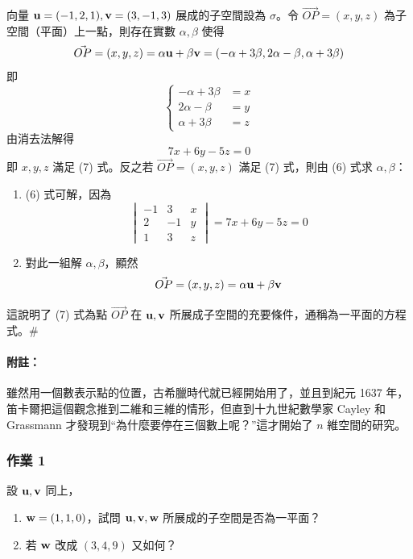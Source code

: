 \begin{discussion}\label{disc:b6s-1-1}
向量 $\boldsymbol{\mathbf{u}}=(-1, 2, 1), \boldsymbol{\mathbf{v}}=(3, -1, 3)$ 展成的子空間設為 $\sigma$。令 $\vec{OP}=(x, y, z)$ 為子空間（平面）上一點，則存在實數 $\alpha, \beta$ 使得
\[ \vec{OP}=(x, y, z) = \alpha \boldsymbol{\mathbf{u}} + \beta \boldsymbol{\mathbf{v}} = (-\alpha+3\beta, 2\alpha-\beta, \alpha+3\beta) \]
即
\begin{equation}
\left\{\begin{aligned}
-\alpha + 3\beta &= x \\
2\alpha - \beta &= y \\
\alpha + 3\beta &= z
\end{aligned}\right. \label{eq:b6s-1-1-6}
\end{equation}
由消去法解得
\begin{equation}
7x + 6y - 5z = 0 \label{eq:b6s-1-1-7}
\end{equation}
即 $x, y, z$ 滿足 (7) 式。反之若 $\vec{OP}=(x, y, z)$ 滿足 (7) 式，則由 (6) 式求 $\alpha, \beta$：
\begin{enumerate}[label=(\roman*), leftmargin=2em]
  \item (6) 式可解，因為
  \[ \begin{vmatrix} -1 & 3 & x \\ 2 & -1 & y \\ 1 & 3 & z \end{vmatrix} = 7x + 6y - 5z = 0 \]
  \item 對此一組解 $\alpha, \beta$，顯然
  \[ \vec{OP} = (x, y, z) = \alpha\boldsymbol{\mathbf{u}} + \beta\boldsymbol{\mathbf{v}} \]
\end{enumerate}
這說明了 (7) 式為點 $\vec{OP}$ 在 $\boldsymbol{\mathbf{u}}, \boldsymbol{\mathbf{v}}$ 所展成子空間的充要條件，通稱為一平面的方程式。\hfill$\#$
\end{discussion}

\paragraph{附註：}雖然用一個數表示點的位置，古希臘時代就已經開始用了，並且到紀元 1637 年，笛卡爾把這個觀念推到二維和三維的情形，但直到十九世紀數學家 Cayley 和 Grassmann 才發現到“為什麼要停在三個數上呢？”這才開始了 $n$ 維空間的研究。

\subsubsection*{作業 1}\label{hw:b6s-1-1}
設 $\boldsymbol{\mathbf{u}}, \boldsymbol{\mathbf{v}}$ 同上，
\begin{enumerate}[label=(\roman*), leftmargin=2em]
  \item $\boldsymbol{\mathbf{w}}=(1, 1, 0)$，試問 $\boldsymbol{\mathbf{u}}, \boldsymbol{\mathbf{v}}, \boldsymbol{\mathbf{w}}$ 所展成的子空間是否為一平面？
  \item 若 $\boldsymbol{\mathbf{w}}$ 改成 $(3, 4, 9)$ 又如何？
\end{enumerate}

